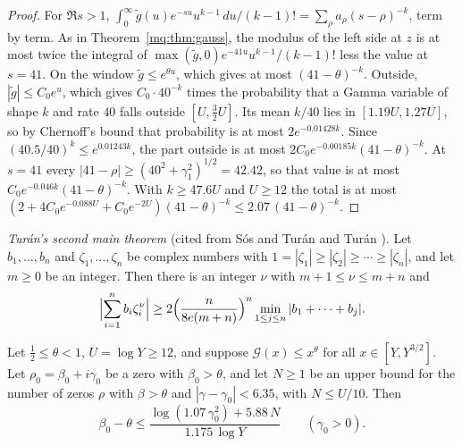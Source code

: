 \begin{proof}
For $\Re s>1$, $\int_0^\infty\tilde g(u)e^{-su}u^{k-1}\,du/(k-1)!=\sum_\rho a_\rho(s-\rho)^{-k}$, term by term. As in Theorem~\ref{mq:thm:gauss}, the modulus of the left side at $z$ is at most twice the integral of $\max(\tilde g,0)e^{-41u}u^{k-1}/(k-1)!$ less the value at $s=41$. On the window $\tilde g\le e^{\theta u}$, which gives at most $(41-\theta)^{-k}$. Outside, $|\tilde g|\le C_0e^u$, which gives $C_0\cdot40^{-k}$ times the probability that a Gamma variable of shape $k$ and rate $40$ falls outside $[U,\frac32U]$. Its mean $k/40$ lies in $[1.19U,1.27U]$, so by Chernoff's bound that probability is at most $2e^{-0.01428k}$. Since $(40.5/40)^k\le e^{0.01243k}$, the part outside is at most $2C_0e^{-0.00185k}(41-\theta)^{-k}$. At $s=41$ every $|41-\rho|\ge(40^2+\gamma_1^2)^{1/2}=42.42$, so that value is at most $C_0e^{-0.046k}(41-\theta)^{-k}$. With $k\ge47.6U$ and $U\ge12$ the total is at most $(2+4C_0e^{-0.088U}+C_0e^{-2U})(41-\theta)^{-k}\le2.07\,(41-\theta)^{-k}$.
\end{proof}

\emph{Tur\'an's second main theorem} (cited from S\'os and Tur\'an \cite{SosTuran55} and Tur\'an \cite{Turan84}). Let $b_1,\dots,b_n$ and $\zeta_1,\dots,\zeta_n$ be complex numbers with $1=|\zeta_1|\ge|\zeta_2|\ge\cdots\ge|\zeta_n|$, and let $m\ge0$ be an integer. Then there is an integer $\nu$ with $m+1\le\nu\le m+n$ and
\[
\Bigl|\sum_{i=1}^nb_i\zeta_i^\nu\Bigr|\ge2\Bigl(\frac n{8e(m+n)}\Bigr)^n\min_{1\le j\le n}|b_1+\cdots+b_j| .
\]

\begin{theorem}\label{mq:thm:effective}
Let $\frac12\le\theta<1$, $U=\log Y\ge12$, and suppose $\mathcal G(x)\le x^\theta$ for all $x\in[Y,Y^{3/2}]$. Let $\rho_0=\beta_0+i\gamma_0$ be a zero with $\beta_0>\theta$, and let $N\ge1$ be an upper bound for the number of zeros $\rho$ with $\beta>\theta$ and $|\gamma-\gamma_0|<6.35$, with $N\le U/10$. Then
\[
\beta_0-\theta\le\frac{\log(1.07\,\gamma_0^2)+5.88\,N}{1.175\,\log Y}\qquad(\gamma_0>0).
\]
\end{theorem}

